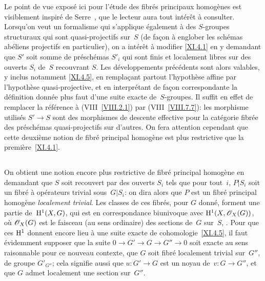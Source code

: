 \begin{remarques}
\label{XI.4.6}
Le point de vue expos\'e ici pour l'\'etude des fibr\'es
principaux homog\`enes est visiblement inspir\'e de Serre~\cite{XI.7}, que
le lecteur aura tout int\'er\^et \`a consulter. Lorsqu'on veut
un formalisme qui s'applique \'egalement \`a des $S$-groupes
structuraux qui sont quasi-projectifs sur~$S$ (de fa\c con \`a
englober les sch\'emas ab\'eliens projectifs en particulier), on a
int\'er\^et \`a modifier \ref{XI.4.1} en y demandant que $S'$
soit somme de pr\'esch\'emas $S'_i$ qui sont finis et localement
libres sur des ouverts $S_i$ de~$S$ recouvrant $S$. Les
d\'eveloppements pr\'ec\'edents sont alors valables, y inclus
notamment \ref{XI.4.5}, en rempla\c cant partout l'hypoth\`ese
affine par l'hypoth\`ese quasi-projective, et en interpr\'etant de
fa\c con correspondante la d\'efinition donn\'ee plus faut d'une
suite exacte de~$S$-groupes. Il suffit en effet de remplacer la
r\'ef\'erence \`a (VIII~\ref{VIII.2.1})
par (VIII~\ref{VIII.7.7}): les morphisme utilis\'es $S'\to S$ sont
des morphismes de descente effective pour la cat\'egorie fibr\'ee
des pr\'esch\'emas quasi-projectifs sur d'autres. On fera
attention cependant que cette deuxi\`eme notion de fibr\'e
principal homog\`ene est plus restrictive que la
premi\`ere~\ref{XI.4.1}.
\end{remarques}

\subsection{}
\label{XI.4.7}
On obtient une notion encore plus restrictive de fibr\'e principal
homog\`ene en demandant que $S$ soit recouvert par des ouverts $S_i$
tels que pour tout~$i$, $P|S_i$ soit un fibr\'e \`a op\'erateurs
trivial sous~$G|S_i$: on dira alors que $P$ est un fibr\'e principal
homog\`ene \emph{localement trivial}.
Les classes de ces fibr\'es, pour $G$ donn\'e, forment une partie
de~$\mathrm{H}^1(X,G)$, qui est en correspondance biunivoque avec
$\H^1(X,\cal{O}_X(G))$, o\`u $\cal{O}_X(G)$ est le faisceau (au sens
ordinaire) des sections de~$G$ sur~$S$, \cf \cite{XI.2}. Pour que ces $\mathrm{H}^1$
donnent encore lieu \`a une suite exacte de
cohomologie~\ref{XI.4.5}, il faut \'evidemment supposer que la suite
$0\to G'\to G\to G''\to 0$ soit exacte au sens raisonnable pour ce
nouveau contexte, \ie que $G$ soit fibr\'e localement trivial
sur~$G''$, de groupe $G'_{G''}$; cela signifie aussi que $u\colon
G'\to G$ est un noyau de~$v\colon G\to G''$, et que $G$ admet
localement une section sur~$G''$.

